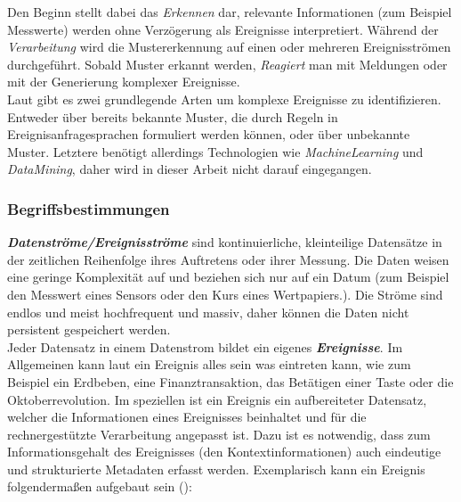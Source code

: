 \documentclass{acm_proc_article-sp}
\begin{document}
Den Beginn stellt dabei das \emph{Erkennen} dar, relevante Informationen (zum Beispiel 
Messwerte) werden ohne Verzögerung als Ereignisse interpretiert. Während der 
\emph{Verarbeitung} wird die Mustererkennung auf einen oder mehreren Ereignisströmen 
durchgeführt. Sobald Muster erkannt werden, \emph{Reagiert} man mit Meldungen oder mit 
der Generierung komplexer Ereignisse.\\
Laut \cite{eckert} gibt es zwei grundlegende Arten um 
komplexe Ereignisse zu identifizieren. Entweder über bereits bekannte Muster, die durch 
Regeln in Ereignisanfragesprachen formuliert werden können, oder über unbekannte Muster. 
Letztere benötigt allerdings Technologien wie \textit{MachineLearning} und 
\textit{DataMining}, daher wird in dieser Arbeit nicht darauf eingegangen.

\subsubsection{Begriffsbestimmungen}\label{begriffsbestimmung}
\vspace{0.1cm}
\textbf{\textit{Datenströme/Ereignisströme}}
sind kontinuierliche, kleinteilige Datensätze in der 
zeitlichen Reihenfolge ihres Auftretens oder ihrer Messung. Die Daten weisen eine geringe 
Komplexität auf und beziehen sich nur auf ein Datum (zum Beispiel den Messwert eines 
Sensors oder den Kurs eines Wertpapiers.). Die Ströme sind endlos und meist 
hochfrequent und massiv, daher können die Daten nicht persistent gespeichert werden.\\
Jeder Datensatz in einem Datenstrom bildet ein eigenes 
\textbf{\textit{Ereignisse}}. Im 
Allgemeinen kann laut \cite{glossary} ein Ereignis alles sein was eintreten kann, wie zum 
Beispiel ein Erdbeben, eine Finanztransaktion, das Betätigen einer Taste oder die 
Oktoberrevolution. Im speziellen ist ein Ereignis ein aufbereiteter Datensatz, welcher 
die Informationen eines Ereignisses beinhaltet und für die rechnergestützte Verarbeitung 
angepasst ist. Dazu ist es notwendig, dass zum Informationsgehalt des Ereignisses (den 
Kontextinformationen) auch eindeutige und strukturierte Metadaten erfasst werden. 
Exemplarisch 
kann ein Ereignis folgendermaßen aufgebaut sein (\cite{hedtstuck}):
\end{document}
